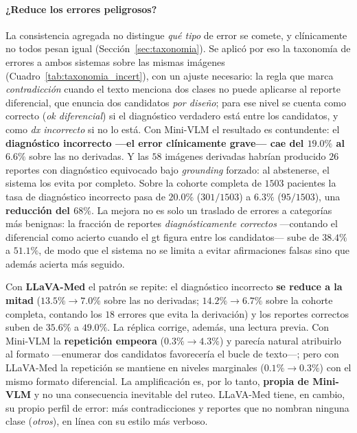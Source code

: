 \documentclass[11pt, a4paper]{article}
\begin{document}
\paragraph{¿Reduce los errores peligrosos?} La consistencia agregada no distingue \emph{qué tipo} de error
se comete, y clínicamente no todos pesan igual (Sección~\ref{sec:taxonomia}). Se aplicó por eso la taxonomía
de errores a ambos sistemas sobre las mismas imágenes (Cuadro~\ref{tab:taxonomia_incert}), con un ajuste
necesario: la regla que marca \emph{contradicción} cuando el texto menciona dos clases no puede aplicarse al
reporte diferencial, que enuncia dos candidatos \emph{por diseño}; para ese nivel se cuenta como correcto
(\emph{ok diferencial}) si el diagnóstico verdadero está entre los candidatos, y como \emph{dx incorrecto}
si no lo está. Con Mini-VLM el resultado es contundente: el \textbf{diagnóstico incorrecto —el error clínicamente grave—
cae del $19.0\%$ al $6.6\%$} sobre las no derivadas. Y las $58$ imágenes derivadas habrían producido
$26$ reportes con diagnóstico equivocado bajo \emph{grounding} forzado: al abstenerse, el sistema los evita
por completo. Sobre la cohorte completa de $1503$ pacientes la tasa de diagnóstico incorrecto pasa de
$\mathbf{20.0\%}$ ($301/1503$) a $\mathbf{6.3\%}$ ($95/1503$), una \textbf{reducción del $68\%$}.
La mejora no es solo un traslado de errores a categorías más benignas: la fracción de reportes
\emph{diagnósticamente correctos} —contando el diferencial como acierto cuando el gt figura entre los
candidatos— sube de $38.4\%$ a $\mathbf{51.1\%}$, de modo que el sistema no se limita a evitar
afirmaciones falsas sino que además acierta más seguido.

Con \textbf{LLaVA-Med} el patrón se repite: el diagnóstico incorrecto \textbf{se reduce a la mitad}
($13.5\% \rightarrow 7.0\%$ sobre las no derivadas; $14.2\% \rightarrow 6.7\%$ sobre la cohorte completa,
contando los $18$ errores que evita la derivación) y los reportes correctos suben de $35.6\%$ a $49.0\%$.
La réplica corrige, además, una lectura previa. Con Mini-VLM la \textbf{repetición empeora}
($0.3\% \rightarrow 4.3\%$) y parecía natural atribuirlo al formato —enumerar dos candidatos favorecería el
bucle de texto—; pero con LLaVA-Med la repetición se mantiene en niveles marginales ($0.1\% \rightarrow
0.3\%$) con el mismo formato diferencial. La amplificación es, por lo tanto, \textbf{propia de Mini-VLM} y
no una consecuencia inevitable del ruteo. LLaVA-Med tiene, en cambio, su propio perfil de error: más
contradicciones y reportes que no nombran ninguna clase (\emph{otros}), en línea con su estilo más verboso.
\end{document}
